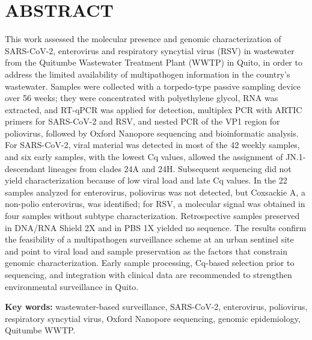 \section{ABSTRACT}

This work assessed the molecular presence and genomic characterization of SARS-CoV-2, enterovirus and respiratory syncytial virus (RSV) in wastewater from the Quitumbe Wastewater Treatment Plant (WWTP) in Quito, in order to address the limited availability of multipathogen information in the country's wastewater. Samples were collected with a torpedo-type passive sampling device over 56 weeks; they were concentrated with polyethylene glycol, RNA was extracted, and RT-qPCR was applied for detection, multiplex PCR with ARTIC primers for SARS-CoV-2 and RSV, and nested PCR of the VP1 region for poliovirus, followed by Oxford Nanopore sequencing and bioinformatic analysis. For SARS-CoV-2, viral material was detected in most of the 42 weekly samples, and six early samples, with the lowest Cq values, allowed the assignment of JN.1-descendant lineages from clades 24A and 24H. Subsequent sequencing did not yield characterization because of low viral load and late Cq values. In the 22 samples analyzed for enterovirus, poliovirus was not detected, but Coxsackie A, a non-polio enterovirus, was identified; for RSV, a molecular signal was obtained in four samples without subtype characterization. Retrospective samples preserved in DNA/RNA Shield 2X and in PBS 1X yielded no sequence. The results confirm the feasibility of a multipathogen surveillance scheme at an urban sentinel site and point to viral load and sample preservation as the factors that constrain genomic characterization. Early sample processing, Cq-based selection prior to sequencing, and integration with clinical data are recommended to strengthen environmental surveillance in Quito.

\vspace{0.5\baselineskip}

\noindent\textbf{Key words:} wastewater-based surveillance, SARS-CoV-2, enterovirus, poliovirus, respiratory syncytial virus, Oxford Nanopore sequencing, genomic epidemiology, Quitumbe WWTP.
